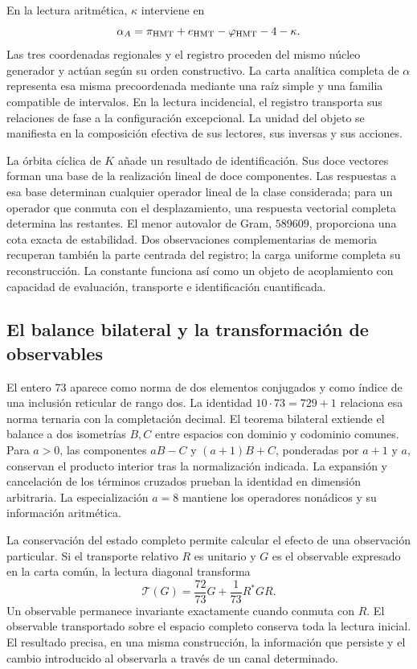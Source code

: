 En la lectura aritmética, \(\kappa\) interviene en
\[
\alpha_A=\pi_{\rm HMT}+e_{\rm HMT}-\varphi_{\rm HMT}-4-\kappa.
\]
Las tres coordenadas regionales y el registro proceden del mismo núcleo generador y actúan según su orden constructivo. La carta analítica completa de \(\alpha\) representa esa misma precoordenada mediante una raíz simple y una familia compatible de intervalos. En la lectura incidencial, el registro transporta sus relaciones de fase a la configuración excepcional. La unidad del objeto se manifiesta en la composición efectiva de sus lectores, sus inversas y sus acciones.

La órbita cíclica de \(K\) añade un resultado de identificación. Sus doce vectores forman una base de la realización lineal de doce componentes. Las respuestas a esa base determinan cualquier operador lineal de la clase considerada; para un operador que conmuta con el desplazamiento, una respuesta vectorial completa determina las restantes. El menor autovalor de Gram, \(589609\), proporciona una cota exacta de estabilidad. Dos observaciones complementarias de memoria recuperan también la parte centrada del registro; la carga uniforme completa su reconstrucción. La constante funciona así como un objeto de acoplamiento con capacidad de evaluación, transporte e identificación cuantificada.

\subsection*{El balance bilateral y la transformación de observables}
El entero \(73\) aparece como norma de dos elementos conjugados y como índice de una inclusión reticular de rango dos. La identidad \(10\cdot73=729+1\) relaciona esa norma ternaria con la completación decimal. El teorema bilateral extiende el balance a dos isometrías \(B,C\) entre espacios con dominio y codominio comunes. Para \(a>0\), las componentes \(aB-C\) y \((a+1)B+C\), ponderadas por \(a+1\) y \(a\), conservan el producto interior tras la normalización indicada. La expansión y cancelación de los términos cruzados prueban la identidad en dimensión arbitraria. La especialización \(a=8\) mantiene los operadores nonádicos y su información aritmética.

La conservación del estado completo permite calcular el efecto de una observación particular. Si el transporte relativo \(R\) es unitario y \(G\) es el observable expresado en la carta común, la lectura diagonal transforma
\[
\mathcal T(G)=\frac{72}{73}G+\frac1{73}R^*GR.
\]
Un observable permanece invariante exactamente cuando conmuta con \(R\). El observable transportado sobre el espacio completo conserva toda la lectura inicial. El resultado precisa, en una misma construcción, la información que persiste y el cambio introducido al observarla a través de un canal determinado.

